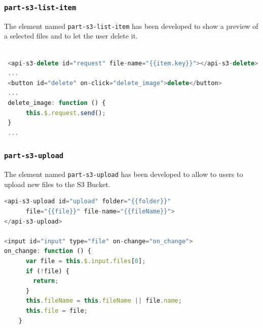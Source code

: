 \subsubsection{\texttt{part-s3-list-item}}
\label{part-s3-list-item}
The element named \texttt{part-s3-list-item} has been developed to show a preview of a selected files and to let the user delete it.
\begin{lstlisting}[language=javascript]

 <api-s3-delete id="request" file-name="{{item.key}}"></api-s3-delete>
 ...
 <button id="delete" on-click="delete_image">delete</button>
 ...
 delete_image: function () {
      this.$.request.send();
 }
 ...
\end{lstlisting}


\subsubsection{\texttt{part-s3-upload}}
\label{part-s3-upload}
The element named \texttt{part-s3-upload} has been developed to allow to users to upload new files to the S3 Bucket.

\begin{lstlisting}[language=javascript]
<api-s3-upload id="upload" folder="{{folder}}"
      file="{{file}}" file-name="{{fileName}}">
</api-s3-upload>

<input id="input" type="file" on-change="on_change">
on_change: function () {
      var file = this.$.input.files[0];
      if (!file) {
        return;
      }
      this.fileName = this.fileName || file.name;
      this.file = file;
    }

\end{lstlisting}


